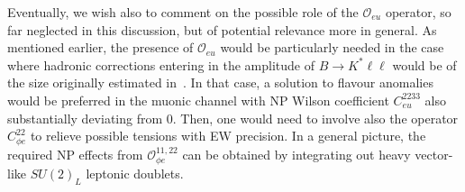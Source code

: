 Eventually, we wish also to comment on the possible role of the $\mathcal O_{eu}$ operator, so far neglected in this discussion, but of potential relevance more in general. As mentioned earlier, the presence of $\mathcal O_{eu}$ would be particularly needed in the case where hadronic corrections entering in the amplitude of $B \to K^* \ell \ell $ would be of the size originally estimated in~\cite{Khodjamirian:2010vf}. 
In that case, a solution to flavour anomalies would be preferred in the muonic channel with NP Wilson coefficient $C_{eu}^{2233}$ also substantially deviating from 0. Then, one would need to involve also the operator $C_{\phi e}^{22}$ to relieve possible tensions with EW precision. In a general picture, the required NP effects from $ \mathcal O_{\phi e}^{11,22}$ can be obtained by integrating out heavy vector-like $SU(2)_{L}$ leptonic doublets.